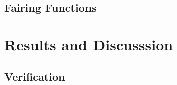\documentclass[12pt]{uthesis-v12}  %
\begin{document}
\section{Fairing Functions}






\chapter{Results and Discusssion}
\section{Verification}





\end{document}
